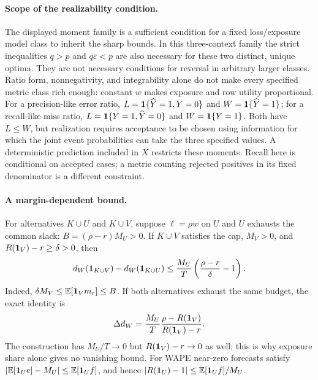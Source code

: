 \paragraph{Scope of the realizability condition.}
The displayed moment family is a sufficient condition for a fixed
loss/exposure model class to inherit the sharp bounds. In this
three-context family the strict inequalities $q>p$ and
$q\varepsilon<p$ are also necessary for these two distinct, unique
optima. They are not necessary conditions for reversal in arbitrary
larger classes. Ratio form, nonnegativity, and integrability alone
do not make every specified metric class rich enough: constant
$w$ makes exposure and row utility proportional. For a precision-like
error ratio, $L=\mathbf{1}\{\widehat Y=1,Y=0\}$ and
$W=\mathbf{1}\{\widehat Y=1\}$; for a recall-like miss ratio,
$L=\mathbf{1}\{Y=1,\widehat Y=0\}$ and $W=\mathbf{1}\{Y=1\}$.
Both have $L\leq W$, but realization requires acceptance to be
chosen using information for which the joint event probabilities
can take the three specified values. A deterministic prediction
included in $X$ restricts these moments. Recall here is conditional
on accepted cases; a metric counting rejected positives in its
fixed denominator is a different constraint.

\paragraph{A margin-dependent bound.}
For alternatives $K\cup U$ and $K\cup V$, suppose $\ell=\rho w$
on $U$ and $U$ exhausts the common slack:
$B=(\rho-r)M_U>0$. If $K\cup V$ satisfies the cap, $M_V>0$,
and $R(\mathbf{1}_V)-r\geq\delta>0$, then
\[
 d_W(\mathbf{1}_{K\cup V})-d_W(\mathbf{1}_{K\cup U})
 \leq\frac{M_U}{T}\left(\frac{\rho-r}{\delta}-1\right).
\]
Indeed, $\delta M_V\leq\mathbb{E}[\mathbf{1}_Vm_r]\leq B$.
If both alternatives exhaust the same budget, the exact identity is
\[
 \Delta d_W=\frac{M_U}{T}
 \frac{\rho-R(\mathbf{1}_V)}{R(\mathbf{1}_V)-r}.
\]
The construction has $M_U/T\to0$ but $R(\mathbf{1}_V)-r\to0$ as well;
this is why exposure share alone gives no vanishing bound.
For WAPE near-zero forecasts satisfy
$|\mathbb{E}[\mathbf{1}_U e]-M_U|\leq\mathbb{E}[\mathbf{1}_Uf]$, and hence
$|R(\mathbf{1}_U)-1|\leq\mathbb{E}[\mathbf{1}_Uf]/M_U$.

